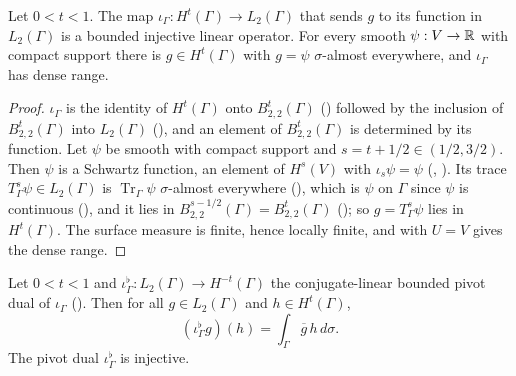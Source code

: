 \begin{lemma}
\label{lem:boundary-sobolev-dense-l2}
\leanok
{}
Let $0 < t < 1$. The map $\iota_\Gamma : H^t(\Gamma) \to L_2(\Gamma)$ that sends $g$ to its
function in $L_2(\Gamma)$ is a bounded injective linear operator. For every smooth
$\psi : V \to \mathbb{R}$ with compact support there is $g \in H^t(\Gamma)$ with $g = \psi$
$\sigma$-almost everywhere, and $\iota_\Gamma$ has dense range.
\end{lemma}

\begin{proof}
\leanok
$\iota_\Gamma$ is the identity of $H^t(\Gamma)$ onto $B^t_{2,2}(\Gamma)$
() followed by the inclusion of $B^t_{2,2}(\Gamma)$ into
$L_2(\Gamma)$ (), and an element of $B^t_{2,2}(\Gamma)$ is
determined by its function. Let $\psi$ be smooth with compact support and
$s = t + 1/2 \in (1/2, 3/2)$. Then $\psi$ is a Schwartz function, an element of $H^s(V)$ with
$\iota_s \psi = \psi$ (, ). Its
trace
$T^s_\Gamma \psi \in L_2(\Gamma)$ is $\operatorname{Tr}_\Gamma \psi$ $\sigma$-almost everywhere
(), which is $\psi$ on $\Gamma$ since $\psi$ is continuous
(), and it lies in $B^{s-1/2}_{2,2}(\Gamma) = B^t_{2,2}(\Gamma)$
(); so $g = T^s_\Gamma \psi$ lies in $H^t(\Gamma)$. The surface
measure is finite, hence locally finite, and  with $U = V$ gives the
dense range.
\end{proof}

\begin{theorem}
\label{thm:boundary-gelfand-triple}
\leanok
{}
Let $0 < t < 1$ and $\iota_\Gamma^\flat : L_2(\Gamma) \to H^{-t}(\Gamma)$ the conjugate-linear
bounded pivot dual of $\iota_\Gamma$ (). Then for all
$g \in L_2(\Gamma)$ and $h \in H^t(\Gamma)$,
\[
  (\iota_\Gamma^\flat g)(h) = \int_\Gamma \overline{g} \, h \, d\sigma .
\]
The pivot dual $\iota_\Gamma^\flat$ is injective.
\end{theorem}


